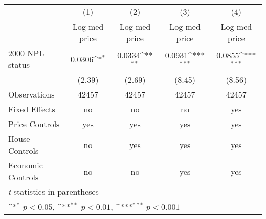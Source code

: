 {
\def\sym#1{\ifmmode^{#1}\else\(^{#1}\)\fi}
\begin{tabular}{l*{4}{c}}
\hline\hline
                    &\multicolumn{1}{c}{(1)}&\multicolumn{1}{c}{(2)}&\multicolumn{1}{c}{(3)}&\multicolumn{1}{c}{(4)}\\
                    &\multicolumn{1}{c}{Log med price}&\multicolumn{1}{c}{Log med price}&\multicolumn{1}{c}{Log med price}&\multicolumn{1}{c}{Log med price}\\
\hline
2000 NPL status     &      0.0306\sym{*}  &      0.0334\sym{**} &      0.0931\sym{***}&      0.0855\sym{***}\\
                    &      (2.39)         &      (2.69)         &      (8.45)         &      (8.56)         \\
\hline
Observations        &       42457         &       42457         &       42457         &       42457         \\
Fixed Effects       &          no         &          no         &          no         &         yes         \\
Price Controls      &         yes         &         yes         &         yes         &         yes         \\
House Controls      &          no         &         yes         &         yes         &         yes         \\
Economic Controls   &          no         &          no         &         yes         &         yes         \\
\hline\hline
\multicolumn{5}{l}{\footnotesize \textit{t} statistics in parentheses}\\
\multicolumn{5}{l}{\footnotesize \sym{*} \(p<0.05\), \sym{**} \(p<0.01\), \sym{***} \(p<0.001\)}\\
\end{tabular}
}
